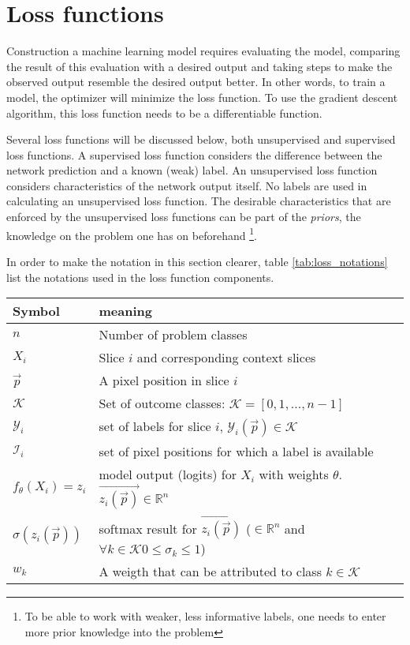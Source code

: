 \section{Loss functions\label{sec:LossFunctions}}

Construction a machine learning model requires evaluating the model, comparing the result of this evaluation with a desired output and taking steps to make the observed output resemble the desired output better.
In other words, to train a model, the optimizer will minimize the loss function.
To use the gradient descent algorithm, this loss function needs to be a differentiable function.

Several loss functions will be discussed below, both unsupervised and supervised loss functions.
A supervised loss function considers the difference between the network prediction and a known (weak) label.
An unsupervised loss function considers characteristics of the network output itself. No labels are used in calculating an unsupervised loss function.
The desirable characteristics that are enforced by the unsupervised loss functions can be part of the \textit{priors}, the knowledge on the problem one has on beforehand
\footnote{To be able to work with weaker, less informative labels, one needs to enter more prior knowledge into the problem}. 


In order to make the notation in this section clearer, table \ref{tab:loss_notations} list the notations used in the loss function components.

\begin{SCtable}[\sidecaptionrelwidth][h]
 
    \begin{tabular}{ l l } 
     \hline
     \hline
     Symbol & meaning \\
     \hline 
    $n$                 & Number of problem classes \\
    $X_i$               & Slice $i$ and corresponding context slices   \\ 
    $\vec{p}$           & A pixel position in slice $i$ \\
    $\mathcal{K}$       & Set of outcome classes: $\mathcal{K} = [0, 1, \dots, n-1]$ \\
    $\mathcal{Y}_i$     & set of labels for slice $i$, $\mathcal{Y}_i(\vec{p}) \in \mathcal{K}$  \\
    $\mathcal{I}_i$     & set of pixel positions for which a label is available \\
    $f_\theta(X_i)=z_i$ & model output (logits) for $X_i$ with weights $\theta$. $\vec{z_i(\vec{p})}\in \mathbb{R}^n$ \\
    $\sigma(z_i(\vec{p}))$   & softmax result for $\vec{z_i(\vec{p})}$ ($\in \mathbb{R}^n$ and $\forall k\in \mathcal{K} 0\leq\sigma_k\leq1$) \\
    $w_k$ & A weigth that can be attributed to class $k \in \mathcal{K}$ \\
     \hline
     \hline
    \end{tabular}
    \caption{List of symbols used in the loss functions\label{tab:loss_notations}}

\end{SCtable}

